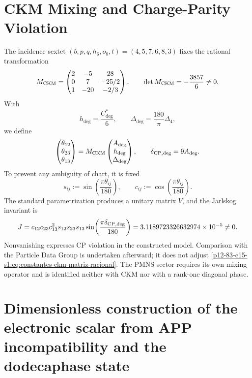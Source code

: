 \label{chap:83-15}

\section*{CKM Mixing and Charge-Parity Violation}

The incidence sextet
\((b,p,q,h_6,o_8,t)=(4,5,7,6,8,3)\) fixes the rational transformation
\begin{equation}\label{p12-83-c15-s1:eq:constantes-ckm-matriz-racional}
 M_{\rm CKM}=
 \begin{pmatrix}
 2&-5&28\\
 0&7&-25/2\\
 1&-20&-2/3
 \end{pmatrix},
 \qquad
 \det M_{\rm CKM}=-\frac{3857}{6}\ne0.
\end{equation}
With
\[
 h_{\deg}=\frac{C^*_{\deg}}6,\qquad
 \Delta_{\deg}=\frac{180}{\pi}\Delta_4,
\]
we define
\[
 \begin{pmatrix}\theta_{12}\\\theta_{23}\\\theta_{13}\end{pmatrix}
 =M_{\rm CKM}
 \begin{pmatrix}A_{\deg}\\h_{\deg}\\\Delta_{\deg}\end{pmatrix},
 \qquad \delta_{{\rm CP},\deg}=9A_{\deg}.
\]
To prevent any ambiguity of chart, it is fixed
\[
 s_{ij}:=\sin\!\left(\frac{\pi\theta_{ij}}{180}\right),\qquad
 c_{ij}:=\cos\!\left(\frac{\pi\theta_{ij}}{180}\right).
\]
The standard parametrization produces a unitary matrix \(V\), and the
Jarlskog invariant is
\begin{equation}\label{p12-83-c15-s1:eq:constantes-jarlskog}
 J=c_{12}c_{23}c_{13}^2s_{12}s_{23}s_{13}
 \sin\!\left(\frac{\pi\delta_{{\rm CP},\deg}}{180}\right)
 =3.1189723326632974\times10^{-5}\ne0.
\end{equation}
Nonvanishing expresses CP violation in the constructed model. Comparison
with the Particle Data Group is undertaken afterward; it does not adjust
\eqref{p12-83-c15-s1:eq:constantes-ckm-matriz-racional}. The PMNS sector requires its own
mixing operator and is identified neither with CKM nor with a rank-one
diagonal phase.


\section{Dimensionless construction of the electronic scalar from APP incompatibility and the dodecaphase state}
\label{p12-83-c15-s2:chap:biografia-electron-rev6}

